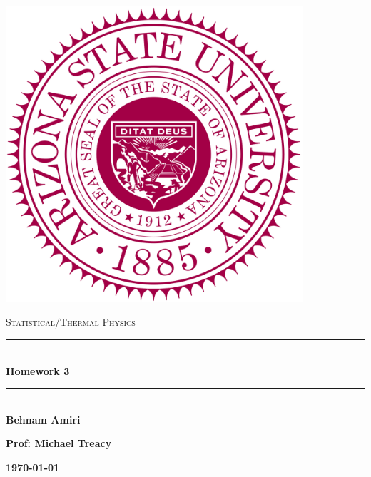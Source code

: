 \documentclass[fleqn]{article}
\begin{document}
  \begin{titlepage}

    \newcommand{\HRule}{\rule{\linewidth}{0.5mm}}

    \center

    \begin{center}
      \includegraphics[height=11cm, width=11cm]{asu.png}
    \end{center}

    \vline

    \textsc{\LARGE Statistical/Thermal Physics}\\[1.5cm]

    \HRule \\[0.5cm]
    { \huge \bfseries Homework 3}\\[0.4cm] 
    \HRule \\[1.0cm]

    \textbf{Behnam Amiri}

    \bigbreak

    \textbf{Prof: Michael Treacy}

    \bigbreak

    \textbf{{\large \today}\\[2cm]}

    \vfill

  \end{titlepage}
\end{document}
